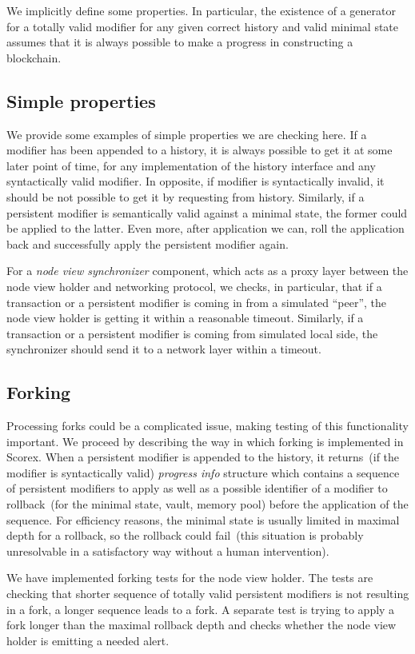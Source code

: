 We implicitly define some properties. In particular, the existence of a generator for a totally valid modifier for any given correct history and valid minimal state assumes that it is always possible to make a progress in constructing a blockchain.

\subsection{Simple properties}
\label{sec:simple-props}

We provide some examples of simple properties we are checking here. If a modifier has been appended to a history, it is always possible to get it at some later point of time, for any implementation of the history interface and any syntactically valid modifier. In opposite, if modifier is syntactically invalid, it should be not possible to get it by requesting from history. Similarly, if a persistent modifier is semantically valid against a minimal state, the former could be applied to the latter. Even more, after application we can, roll the application back and successfully apply the persistent modifier again.  

For a {\em node view synchronizer} component, which acts as a proxy layer between the node view holder and networking protocol, we checks, in particular, that if a transaction or a persistent modifier is coming in from a simulated ``peer'', the node view holder is getting it within a reasonable timeout. Similarly, if a transaction or a persistent modifier is coming from simulated local side, the synchronizer should send it to a network layer within a timeout.

\subsection{Forking}
\label{sec:forking}

Processing forks could be a complicated issue, making testing of this functionality important. We proceed by describing the way in which forking is implemented in Scorex. When a persistent modifier is appended to the history, it returns~(if the modifier is syntactically valid) {\em progress info} structure which contains a sequence of persistent modifiers to apply as well as a possible identifier of a modifier to rollback~(for the minimal state, vault, memory pool) before the application of the sequence. For efficiency reasons, the minimal state is usually limited in maximal depth for a rollback, so the rollback could fail~(this situation is probably unresolvable in a satisfactory way without a human intervention). 

We have implemented forking tests for the node view holder. The tests are checking that shorter sequence of totally valid persistent modifiers is not resulting in a fork, a longer sequence leads to a fork. A separate test is trying to apply a fork longer than the maximal rollback depth and checks whether the node view holder is emitting a needed alert.
